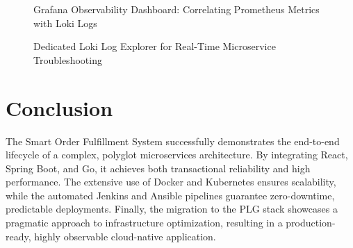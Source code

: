 \documentclass[12pt,a4paper]{report}
\begin{document}
\begin{figure}[H]
    \centering
    \vspace{7cm} %
    \caption{Grafana Observability Dashboard: Correlating Prometheus Metrics with Loki Logs}
\end{figure}

\begin{figure}[H]
    \centering
    \vspace{7cm} %
    \caption{Dedicated Loki Log Explorer for Real-Time Microservice Troubleshooting}
\end{figure}

\chapter{Conclusion}
The Smart Order Fulfillment System successfully demonstrates the end-to-end lifecycle of a complex, polyglot microservices architecture. By integrating React, Spring Boot, and Go, it achieves both transactional reliability and high performance. The extensive use of Docker and Kubernetes ensures scalability, while the automated Jenkins and Ansible pipelines guarantee zero-downtime, predictable deployments. Finally, the migration to the PLG stack showcases a pragmatic approach to infrastructure optimization, resulting in a production-ready, highly observable cloud-native application.
\end{document}

